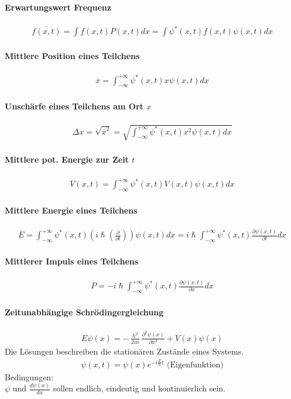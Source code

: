 \documentclass[10pt,a4paper]{article}
\begin{document}
\paragraph{Erwartungswert Frequenz}
\begin{align}
\overline{f(x,t)} = \int f(x,t)P(x,t)dx = \int \psi^*(x,t)f(x,t)\psi(x,t)dx
\end{align}
\paragraph{Mittlere Position eines Teilchens}
\begin{align}
\overline{x}= \int_{-\infty}^{+\infty} \psi^*(x,t) x \psi(x,t)dx
\end{align}
\paragraph{Unschärfe eines Teilchens am Ort $x$}
\begin{align}
\Delta x = \sqrt{\overline{x}^2}= \sqrt{\int_{-\infty}^{+\infty} \psi^*(x,t) x^2 \psi(x,t)dx}
\end{align}
\paragraph{Mittlere pot. Energie zur Zeit $t$}
\begin{align}
V(x,t) = \int_{-\infty}^{+\infty} \psi^*(x,t) V(x,t) \psi(x,t)dx
\end{align}
\paragraph{Mittlere Energie eines Teilchens}
\begin{align}
\overline{E}=\int_{-\infty}^{+\infty} \psi^*(x,t) \left(i\hslash\left(\frac{\partial}{\partial t}\right)\right) \psi(x,t)dx =i\hslash \int_{-\infty}^{+\infty} \psi^*(x,t) \frac{\partial\psi(x,t)}{\partial t} dx
\end{align}
\paragraph{Mittlerer Impuls eines Teilchens}
\begin{align}
\overline{P}=-i\hslash \int_{-\infty}^{+\infty} \psi^*(x,t) \frac{\partial\psi(x,t)}{\partial x} dx
\end{align}
\paragraph{Zeitunabhängige Schrödingergleichung}
\begin{align}
E\psi(x)= -\frac{\hslash^2}{2m}\frac{\partial^2\psi(x)}{\partial x^2} + V(x)\psi(x)
\end{align}
Die Lösungen beschreiben die stationären Zustände eines Systems.
\begin{align}
\psi(x,t) = \psi(x)e^{-i\frac{E}{\hslash}t} \text{ (Eigenfunktion)}
\end{align}
Bedingungen:\\
$\psi$ und $\frac{d\psi(x)}{dx}$ sollen
endlich, eindeutig und kontinuierlich sein.
\end{document}
